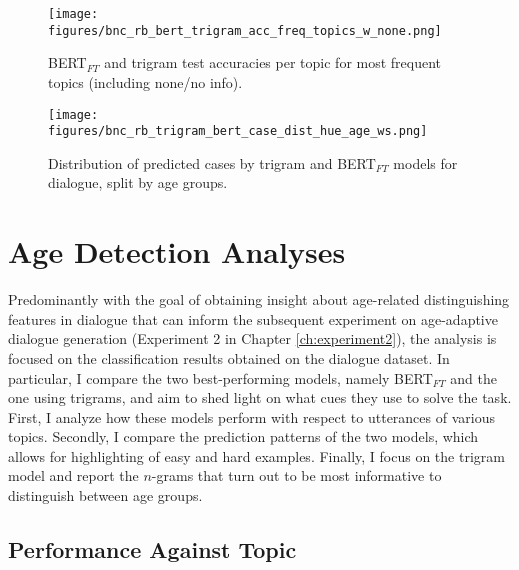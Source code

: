 \begin{figure}
    \centering
    \begin{minipage}{0.45\textwidth}
        \centering
        \texttt{[image: figures/bnc\_rb\_bert\_trigram\_acc\_freq\_topics\_w\_none.png]} %
        \caption{BERT$_{FT}$ and trigram test accuracies per topic for most frequent topics (including none/no info).}\label{fig:bnc_tri_bert_acc_topics_w_none}
    \end{minipage}\hfill
    \begin{minipage}{0.45\textwidth}
        \centering
        \texttt{[image: figures/bnc\_rb\_trigram\_bert\_case\_dist\_hue\_age\_ws.png]} %
        \caption{Distribution of predicted cases by trigram and BERT$_{FT}$ models for dialogue, split by age groups.}\label{fig:bnc_blog_age_topic_dist_incl_unk}
    \end{minipage}
\end{figure}

\section{Age Detection Analyses}
\label{sec:exp1_analyses}
Predominantly with the goal of obtaining insight about age-related distinguishing features in dialogue that can inform the subsequent experiment on age-adaptive dialogue generation (Experiment 2 in Chapter \ref{ch:experiment2}), the analysis is focused on the classification results obtained on the dialogue dataset. In particular, I compare the two best-performing models, namely BERT$_{FT}$
and the one using trigrams, and aim to shed light on  what cues they use to solve the task.
First, I analyze how these models perform with respect to utterances of various topics.
Secondly, I compare the prediction patterns of the two models, which allows for highlighting of easy and hard examples.
Finally, I focus on the trigram model and report the $n$-grams that turn out to be most informative to distinguish between age groups.


\subsection{Performance Against Topic}

